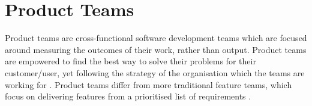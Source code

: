 \section{Product Teams}
Product teams are cross-functional software development teams which are focused around measuring the outcomes of their work, rather than output. Product teams are empowered to find the best way to solve their problems for their customer/user, yet following the strategy of the organisation which the teams are working for \cite{product_teams_2019}. Product teams differ from more traditional feature teams, which focus on delivering features from a prioritised list of requirements \cite{product_teams_2019}.
